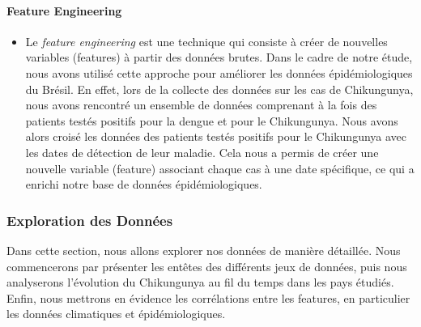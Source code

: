 \paragraph*{Feature Engineering}
\begin{itemize}
	\item[\space] Le \textit{feature engineering} est une technique qui consiste à créer de nouvelles variables (features) à partir des données brutes. Dans le cadre de notre étude, nous avons utilisé cette approche pour améliorer les données épidémiologiques du Brésil. En effet, lors de la collecte des données sur les cas de Chikungunya, nous avons rencontré un ensemble de données comprenant à la fois des patients testés positifs pour la dengue et pour le Chikungunya. Nous avons alors croisé les données des patients testés positifs pour le Chikungunya avec les dates de détection de leur maladie. Cela nous a permis de créer une nouvelle variable (feature) associant chaque cas à une date spécifique, ce qui a enrichi notre base de données épidémiologiques.
\end{itemize}

\subsubsection{Exploration des Données}
Dans cette section, nous allons explorer nos données de manière détaillée. Nous commencerons par présenter les entêtes des différents jeux de données, puis nous analyserons l'évolution du Chikungunya au fil du temps dans les pays étudiés. Enfin, nous mettrons en évidence les corrélations entre les features, en particulier les données climatiques et épidémiologiques.

